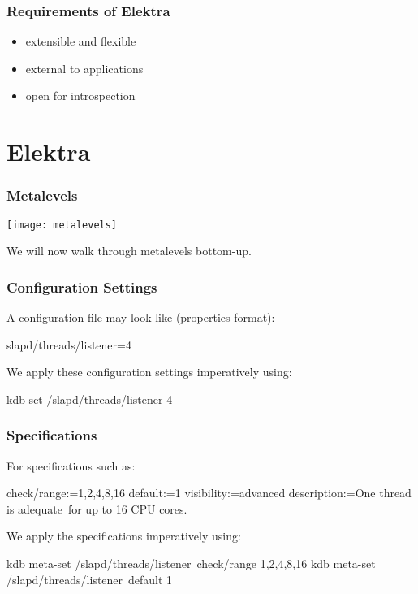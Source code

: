 \begin{frame}
	\frametitle{Requirements of Elektra~\cite{raab2017challenges}}

	\begin{itemize}
		\item extensible and flexible
		\item external to applications
		\item open for introspection
	\end{itemize}
\end{frame}

\section{Elektra}

\begin{frame}
	\frametitle{Metalevels}
	\texttt{[image: metalevels]}

	We will now walk through metalevels bottom-up.
\end{frame}

\begin{frame}[fragile]
	\frametitle{Configuration Settings}

	A configuration file may look like (properties format):

	\begin{code}[language=CfgElektra]
	slapd/threads/listener=4
	\end{code}

	\vspace{1cm}

	We apply these configuration settings imperatively using:

	\begin{code}[language=bash]
	kdb set /slapd/threads/listener 4
	\end{code}
\end{frame}

\begin{frame}[fragile]
	\frametitle{Specifications}
	For specifications such as:

	\begin{code}
	  check/range:=1,2,4,8,16
	  default:=1
	  visibility:=advanced
	  description:=One thread is adequate\
		       for up to 16 CPU cores.
	\end{code}

	\vspace{0.6cm}

	We apply the specifications imperatively using:

	\begin{code}[language=bash,morekeywords={meta-set}]
	kdb meta-set /slapd/threads/listener\
		check/range 1,2,4,8,16
	kdb meta-set /slapd/threads/listener\
		default 1
	\end{code}
\end{frame}

